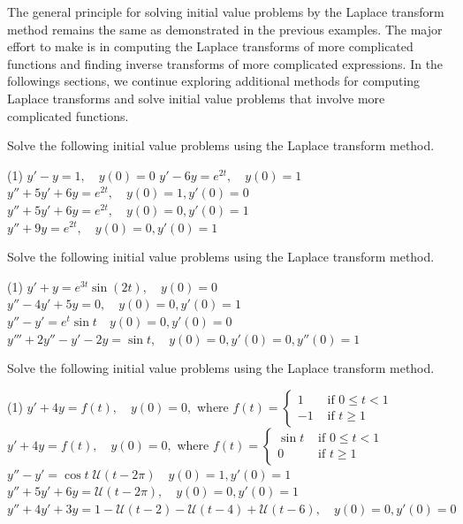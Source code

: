 The general principle for solving initial value problems by the Laplace transform method remains the same as demonstrated in the previous examples. The major effort to make is in computing the Laplace transforms of more complicated functions and finding inverse transforms of more complicated expressions. 
In the followings sections, we continue  exploring additional methods for computing Laplace transforms and solve initial value problems that involve more complicated functions.



\begin{Exercise}\label{EX72}
	\vspace{-\baselineskip}%
	\Question
 Solve the following initial value problems using the Laplace transform method.
	\begin{tasks}(1)
		\task $y'-y=1, \quad y(0) = 0$  
		\task $y' -6y = e^{2t}, \quad y(0) = 1$ 
		\task $y'' +5y'+6y = e^{2t}, \quad y(0) = 1, y'(0)=0$ 
		\task $y'' +5y'+6y = e^{2t}, \quad y(0) = 0, y'(0)=1$ 
		\task $y'' +9y = e^{2t}, \quad y(0) = 0, y'(0)=1$ 
\end{tasks}
	
	
	\Question Solve the following initial value problems using the Laplace transform method.
	\begin{tasks}[resume=false](1)
		\task $y'+y = e^{3t}\sin(2t), \quad y(0) = 0$
		\task $y''-4y'+5y = 0, \quad y(0) = 0, y'(0) =1$
		\task $y''-y'= e^t \sin t\quad y(0) =0, y'(0) =0$
		\task $y'''+2y''-y'-2y = \sin t, \quad y(0)= 0, y'(0)= 0, y''(0) =1$
	\end{tasks}
	
		\Question Solve the following initial value problems using the Laplace transform method.
	\begin{tasks}[resume=false](1)
		\task $y'+4y = f(t), \quad y(0) = 0,$ where $f(t) =\begin{cases}
			1 &\text{ if } 0\le t <1\\
			-1&\text{ if } t\ge 1
		\end{cases}$
		\task $y'+4y = f(t), \quad y(0) = 0,$ where $f(t) =\begin{cases}
			\sin t&\text{ if } 0\le t <1\\
			0&\text{ if } t\ge 1
		\end{cases}$
		\task $y''-y'= \cos t\; \mathcal{U}(t-2\pi)\quad y(0) =1, y'(0) =1$
		\task $y''+5y'+6y = \mathcal{U}(t-2\pi), \quad y(0)= 0, y'(0)= 1$
		\task $y''+4y'+3y = 1- \mathcal{U}(t-2) - \mathcal{U}(t-4) +\mathcal{U}(t-6), \quad y(0) = 0, y'(0) = 0$
	\end{tasks}
	
	
\end{Exercise}
